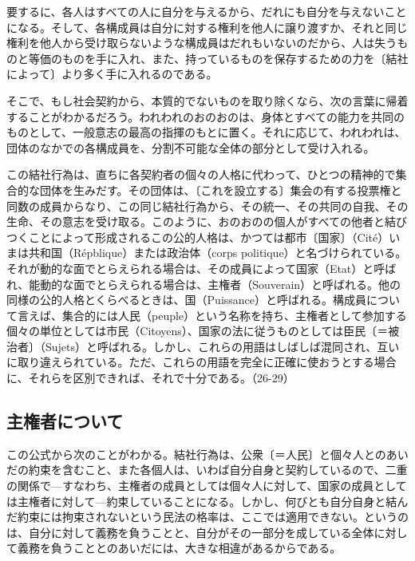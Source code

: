 要するに、各人はすべての人に自分を与えるから、だれにも自分を与えないことになる。そして、各構成員は自分に対する権利を他人に譲り渡すか、それと同じ権利を他人から受け取らないような構成員はだれもいないのだから、人は失うものと等価のものを手に入れ、また、持っているものを保存するための力を〔結社によって〕より多く手に入れるのである。

そこで、もし社会契約から、本質的でないものを取り除くなら、次の言葉に帰着することがわかるだろう。われわれのおのおのは、身体とすべての能力を共同のものとして、一般意志の最高の指揮のもとに置く。それに応じて、われわれは、団体のなかでの各構成員を、分割不可能な全体の部分として受け入れる。

この結社行為は、直ちに各契約者の個々の人格に代わって、ひとつの精神的で集合的な団体を生みだす。その団体は、〔これを設立する〕集会の有する投票権と同数の成員からなり、この同じ結社行為から、その統一、その共同の自我、その生命、その意志を受け取る。このように、おのおのの個人がすべての他者と結びつくことによって形成されるこの公的人格は、かつては都市〔国家〕（Cité）いまは共和国（Répblique）または政治体（corps politique）と名づけられている。それが動的な面でとらえられる場合は、その成員によって国家（Etat）と呼ばれ、能動的な面でとらえられる場合は、主権者（Souverain）と呼ばれる。他の同様の公的人格とくらべるときは、国（Puissance）と呼ばれる。構成員について言えば、集合的には人民（peuple）という名称を持ち、主権者として参加する個々の単位としては市民（Citoyens）、国家の法に従うものとしては臣民〔＝被治者〕（Sujets）と呼ばれる。しかし、これらの用語はしばしば混同され、互いに取り違えられている。ただ、これらの用語を完全に正確に使おうとする場合に、それらを区別できれば、それで十分である。（26-29）

\subsection{主権者について}



この公式から次のことがわかる。結社行為は、公衆〔＝人民〕と個々人とのあいだの約束を含むこと、また各個人は、いわば自分自身と契約しているので、二重の関係で{\——}すなわち、主権者の成員としては個々人に対して、国家の成員としては主権者に対して{\——}約束していることになる。しかし、何びとも自分自身と結んだ約束には拘束されないという民法の格率は、ここでは適用できない。というのは、自分に対して義務を負うことと、自分がその一部分を成している全体に対して義務を負うこととのあいだには、大きな相違があるからである。

